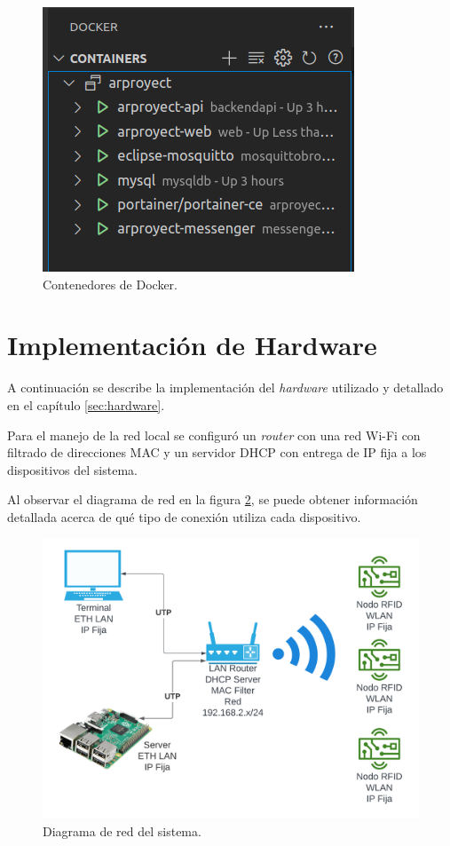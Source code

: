 \begin{figure}[H]
	\centering
	\includegraphics[scale=.60]{./Figures/docker-interfaz.png}
	\caption{Contenedores de Docker.}
	\label{fig:docker-interfaz}
\end{figure}

\section{Implementación de Hardware}
\label{sec:implementacionhw}

A continuación se describe la implementación del \textit{hardware} utilizado y detallado en el capítulo \ref{sec:hardware}.

Para el manejo de la red local se configuró un \textit{router} con una red Wi-Fi con filtrado de direcciones MAC y un servidor DHCP con entrega de IP fija a los dispositivos del sistema.

Al observar el diagrama de red en la figura \ref{fig:diagramared}, se puede obtener información detallada acerca de qué tipo de conexión utiliza cada dispositivo.

\begin{figure}[H]
	\centering
	\includegraphics[width=\textwidth]{./Figures/diagrama-red.png}
	\caption{Diagrama de red del sistema.}
	\label{fig:diagramared}
\end{figure}

